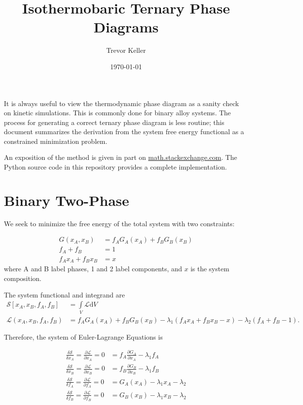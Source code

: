 \documentclass[10pt]{article}
\title{Isothermobaric Ternary Phase Diagrams}
\author{Trevor Keller}
\date{\small \today}
\begin{document}
\maketitle

It is always useful to view the thermodynamic phase diagram as a sanity check on
kinetic simulations. This is commonly done for binary alloy systems. The process
for generating a correct ternary phase diagram is less routine; this document
summarizes the derivation from the system free energy functional as a
constrained minimization problem.

An exposition of the method is given in part on
\href{https://math.stackexchange.com/questions/632/validating-a-mathematical-model-lagrange-formulation-and-geometry}
{math.stackexchange.com}. The Python source code in this repository provides a
complete implementation.

\section*{Binary Two-Phase}

We seek to minimize the free energy of the total system with two constraints:

\begin{align}
  G(x_A, x_B) &= f_A G_A(x_A) + f_B G_B(x_B)\\
  f_A + f_B &= 1\\
  f_A x_A + f_B x_B &= x
\end{align}
where A and B label phases, 1 and 2 label components, and $x$ is the system composition.

The system functional and integrand are
\begin{align}
  \mathcal{S}[x_A, x_B, f_A, f_B] &= \int\limits_V\mathcal{L}\mathrm{d}V\\
  \mathcal{L}(x_A, x_B, f_A, f_B) &= f_A G_A(x_A) + f_B G_B(x_B) - \lambda_1(f_A x_A + f_B x_B - x) - \lambda_2(f_A + f_B - 1).
\end{align}

Therefore, the system of Euler-Lagrange Equations is

\begin{align}
  \label{eqn:el1}
  \frac{\delta\mathcal{S}}{\delta x_A} = \frac{\partial\mathcal{L}}{\partial x_A} = 0 &= f_A \frac{\partial G_A}{\partial x_A} - \lambda_1 f_A\\
  \label{eqn:el2}
  \frac{\delta\mathcal{S}}{\delta x_B} = \frac{\partial\mathcal{L}}{\partial x_B} = 0 &= f_B \frac{\partial G_B}{\partial x_B} - \lambda_1 f_B\\
  \label{eqn:el3}
  \frac{\delta\mathcal{S}}{\delta f_A} = \frac{\partial\mathcal{L}}{\partial f_A} = 0 &= G_A(x_A) - \lambda_1x_A - \lambda_2\\
  \label{eqn:el4}
  \frac{\delta\mathcal{S}}{\delta f_B} = \frac{\partial\mathcal{L}}{\partial f_B} = 0 &= G_B(x_B) - \lambda_1x_B - \lambda_2
\end{align}
\end{document}
